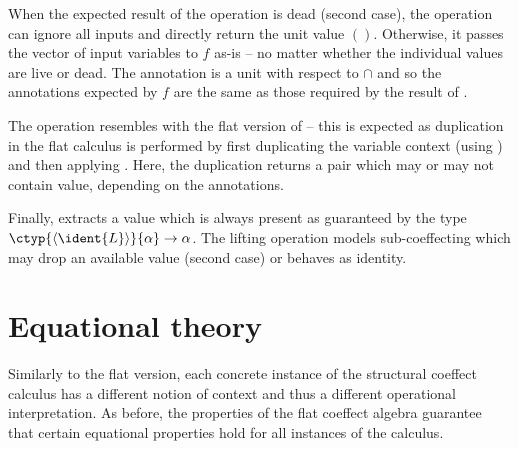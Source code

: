 \noindent
When the expected result of the  operation is dead (second case), the operation can
ignore all inputs and directly return the unit value $()$. Otherwise, it passes the vector of 
input variables to $f$ as-is -- no matter whether the individual values are live or dead. The
 annotation is a unit with respect to $\cap$ and so the annotations expected by $f$ are
the same as those required by the result of .

The  operation resembles with the flat version of  -- this is expected as
duplication in the flat calculus is performed by first duplicating the variable context (using 
) and then applying . Here, the duplication returns a pair which may or
may not contain value, depending on the annotations.

Finally,  extracts a value which is always present as guaranteed by the type
$\ctyp{\langle \ident{L} \rangle}{\alpha} \rightarrow \alpha$. The lifting operation models 
sub-coeffecting which may drop an available value (second case) or behaves as identity.


%                                                                   
%

\section{Equational theory}
\label{sec:struct-syntax}

Similarly to the flat version, each concrete instance of the structural coeffect calculus has a 
different notion of context and thus a different operational interpretation. As before, the 
properties of the flat coeffect algebra guarantee that certain equational properties hold for 
all instances of the calculus. 

